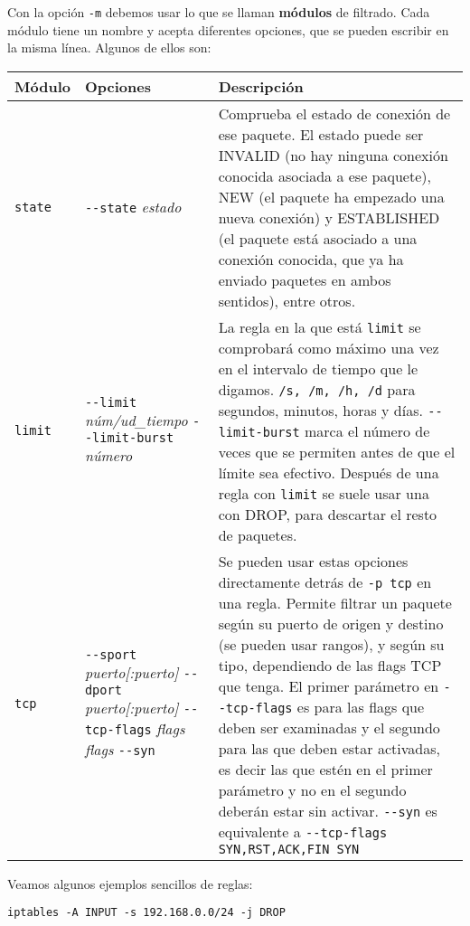 Con la opción \lstinline!-m! debemos usar lo que se llaman \textbf{módulos} de filtrado. Cada módulo tiene un nombre y acepta diferentes opciones, que se pueden escribir en la misma línea. Algunos de ellos son:

\begin{longtable}{p{} | p{} | p{}}
\textbf{Módulo} &  \textbf{Opciones} & \textbf{Descripción}\\\hline
\lstinline!state! & \lstinline!--state! \textit{estado} & Comprueba el estado de conexión de ese paquete. El estado puede ser INVALID (no hay ninguna conexión conocida asociada a ese paquete), NEW (el paquete ha empezado una nueva conexión) y ESTABLISHED (el paquete está asociado a una conexión conocida, que ya ha enviado paquetes en ambos sentidos), entre otros.\\\hline
\lstinline!limit! & \lstinline!--limit! \textit{núm/ud\_tiempo} \quad \lstinline!--limit-burst! \textit{número} & La regla en la que está \lstinline!limit! se comprobará como máximo una vez en el intervalo de tiempo que le digamos. \lstinline!/s, /m, /h, /d! para segundos, minutos, horas y días. \lstinline!--limit-burst! marca el número de veces que se permiten antes de que el límite sea efectivo. Después de una regla con \lstinline!limit! se suele usar una con DROP, para descartar el resto de paquetes.\\\hline
\lstinline!tcp! & \lstinline!--sport! \textit{puerto[:puerto]} \lstinline!--dport! \textit{puerto[:puerto]} \hspace{2cm} \lstinline!--tcp-flags! \textit{flags} \textit{flags}
\lstinline!--syn! & Se pueden usar estas opciones directamente detrás de \lstinline!-p tcp! en una regla. Permite filtrar un paquete según su puerto de origen y destino (se pueden usar rangos), y según su tipo, dependiendo de las flags TCP que tenga. El primer parámetro en \lstinline!--tcp-flags! es para las flags que deben ser examinadas y el segundo para las que deben estar activadas, es decir las que estén en el primer parámetro y no en el segundo deberán estar sin activar. \lstinline!--syn! es equivalente a \lstinline!--tcp-flags SYN,RST,ACK,FIN SYN!\\
\end{longtable}

\newpage
Veamos algunos ejemplos sencillos de reglas:\\

\begin{lstlisting}
iptables -A INPUT -s 192.168.0.0/24 -j DROP
\end{lstlisting}

